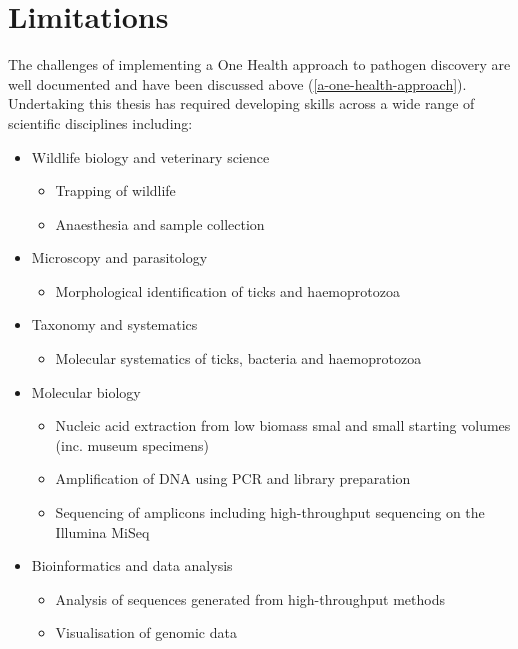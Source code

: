 \documentclass[a4paper, nobind]{templates/ociamthesis}
\providecommand{\tightlist}{%
  \setlength{\itemsep}{0pt}\setlength{\parskip}{0pt}}
\begin{document}
\hypertarget{limitations-1}{%
\section{Limitations}\label{limitations-1}}

The challenges of implementing a One Health approach to pathogen discovery are well documented \autocite{steeleWhatMakesEffective2019,predictconsortiumImplementingOneHealth2020} and have been discussed above (\ref{a-one-health-approach}).
Undertaking this thesis has required developing skills across a wide range of scientific disciplines including:

\begin{itemize}
\tightlist
\item
  Wildlife biology and veterinary science

  \begin{itemize}
  \tightlist
  \item
    Trapping of wildlife
  \item
    Anaesthesia and sample collection
  \end{itemize}
\item
  Microscopy and parasitology

  \begin{itemize}
  \tightlist
  \item
    Morphological identification of ticks and haemoprotozoa
  \end{itemize}
\item
  Taxonomy and systematics

  \begin{itemize}
  \tightlist
  \item
    Molecular systematics of ticks, bacteria and haemoprotozoa
  \end{itemize}
\item
  Molecular biology

  \begin{itemize}
  \tightlist
  \item
    Nucleic acid extraction from low biomass smal and small starting volumes (inc. museum specimens)
  \item
    Amplification of DNA using PCR and library preparation
  \item
    Sequencing of amplicons including high-throughput sequencing on the Illumina MiSeq
  \end{itemize}
\item
  Bioinformatics and data analysis

  \begin{itemize}
  \tightlist
  \item
    Analysis of sequences generated from high-throughput methods
  \item
    Visualisation of genomic data
  \end{itemize}
\end{itemize}
\end{document}
